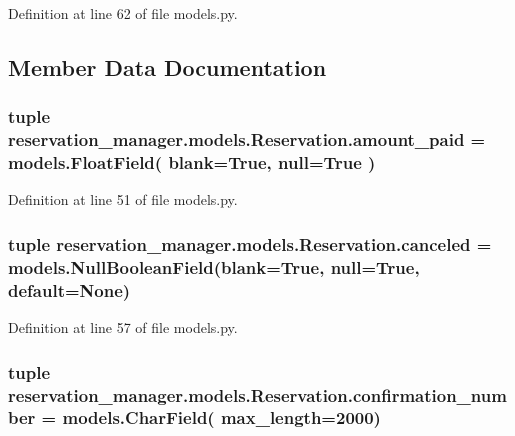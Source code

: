 Definition at line 62 of file models.\-py.



\subsection{Member Data Documentation}
\hypertarget{classreservation__manager_1_1models_1_1Reservation_ac2f88fc49e8a194dc3eb780073fef8f5}{
\subsubsection[{amount\-\_\-paid}]{\setlength{\rightskip}{0pt plus 5cm}tuple reservation\-\_\-manager.\-models.\-Reservation.\-amount\-\_\-paid = models.\-Float\-Field( blank=True, null=True )\hspace{0.3cm}{\ttfamily [static]}}}\label{classreservation__manager_1_1models_1_1Reservation_ac2f88fc49e8a194dc3eb780073fef8f5}


Definition at line 51 of file models.\-py.

\hypertarget{classreservation__manager_1_1models_1_1Reservation_a4aeae1676d89b1d431438c20939ce812}{
\subsubsection[{canceled}]{\setlength{\rightskip}{0pt plus 5cm}tuple reservation\-\_\-manager.\-models.\-Reservation.\-canceled = models.\-Null\-Boolean\-Field(blank=True, null=True, default=None)\hspace{0.3cm}{\ttfamily [static]}}}\label{classreservation__manager_1_1models_1_1Reservation_a4aeae1676d89b1d431438c20939ce812}


Definition at line 57 of file models.\-py.

\hypertarget{classreservation__manager_1_1models_1_1Reservation_aa8d05ddeae1fbe64623db8ca91ea5d21}{
\subsubsection[{confirmation\-\_\-number}]{\setlength{\rightskip}{0pt plus 5cm}tuple reservation\-\_\-manager.\-models.\-Reservation.\-confirmation\-\_\-number = models.\-Char\-Field( max\-\_\-length=2000)\hspace{0.3cm}{\ttfamily [static]}}}\label{classreservation__manager_1_1models_1_1Reservation_aa8d05ddeae1fbe64623db8ca91ea5d21}


